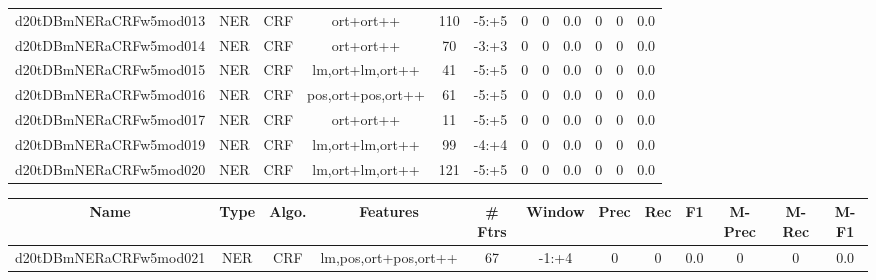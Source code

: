 \documentclass[a4paper]{article}
\begin{document}
\begin{landscape}
\begin{center}
\begin{tabular}{ |c|c|c|c|c|c|c|c|c|c|c|c|}
 
 	
 	\small{ d20tDBmNERaCRFw5mod013 } & \small{ NER} & \small{  CRF }  & ort+ort++  &  110 &  \small{  -5:+5 }  &  0 & 0 & 0.0  &  0 & 0 & 0.0 \\
 	

 
 	
 	\small{ d20tDBmNERaCRFw5mod014 } & \small{ NER} & \small{  CRF }  & ort+ort++  &  70 &  \small{  -3:+3 }  &  0 & 0 & 0.0  &  0 & 0 & 0.0 \\
 	

 
 	
 	\small{ d20tDBmNERaCRFw5mod015 } & \small{ NER} & \small{  CRF }  & lm,ort+lm,ort++  &  41 &  \small{  -5:+5 }  &  0 & 0 & 0.0  &  0 & 0 & 0.0 \\
 	

 
 	
 	\small{ d20tDBmNERaCRFw5mod016 } & \small{ NER} & \small{  CRF }  & pos,ort+pos,ort++  &  61 &  \small{  -5:+5 }  &  0 & 0 & 0.0  &  0 & 0 & 0.0 \\
 	

 
 	
 	\small{ d20tDBmNERaCRFw5mod017 } & \small{ NER} & \small{  CRF }  & ort+ort++  &  11 &  \small{  -5:+5 }  &  0 & 0 & 0.0  &  0 & 0 & 0.0 \\
 	

 
 	
 	\small{ d20tDBmNERaCRFw5mod019 } & \small{ NER} & \small{  CRF }  & lm,ort+lm,ort++  &  99 &  \small{  -4:+4 }  &  0 & 0 & 0.0  &  0 & 0 & 0.0 \\
 	

 
 	
 	\small{ d20tDBmNERaCRFw5mod020 } & \small{ NER} & \small{  CRF }  & lm,ort+lm,ort++  &  121 &  \small{  -5:+5 }  &  0 & 0 & 0.0  &  0 & 0 & 0.0 \\
 	
 \hline
\end{tabular}
\end{center}




\begin{center}
\begin{tabular}{ |c|c|c|c|c|c|c|c|c|c|c|c|} 
 \hline
 	Name & Type & Algo. & Features & \# Ftrs & Window & Prec & Rec & F1 & M-Prec & M-Rec & M-F1\\
 \hline

 	

 
 	
 	\small{ d20tDBmNERaCRFw5mod021 } & \small{ NER} & \small{  CRF }  & lm,pos,ort+pos,ort++  &  67 &  \small{  -1:+4 }  &  0 & 0 & 0.0  &  0 & 0 & 0.0 \\
 	


\end{tabular}
\end{center}
\end{landscape}
\end{document}

